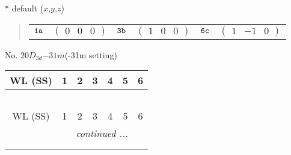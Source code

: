 \documentclass[fleqn,9pt,landscape]{jsarticle}
\begin{document}
* default ($x$,$y$,$z$)
\begin{quote}
\begin{tabular}{cccccc}
$ {\tt 1a} $ & $ \begin{pmatrix} 0 & 0 & 0 \end{pmatrix} $ & $ {\tt 3b} $ & $ \begin{pmatrix} 1 & 0 & 0 \end{pmatrix} $ & $ {\tt 6c} $ & $ \begin{pmatrix} 1 & -1 & 0 \end{pmatrix} $
\end{tabular}
\end{quote}
\newpage
No. 20\quad$D_{3d}$\quad$-31m$\quad(-31m setting)\quad[ trigonal ]
\begin{center}
\renewcommand{\arraystretch}{1.2}
\begin{longtable}{ccccccc}
 \hline \hline
WL (SS) & 1 & 2 & 3 & 4 & 5 & 6 \\ \hline \endfirsthead

\multicolumn{6}{l}{\tablename\ \thetable{}} \\
 \hline \hline
WL (SS) & 1 & 2 & 3 & 4 & 5 & 6 \\ \hline \endhead

 \hline \hline
\multicolumn{6}{r}{\footnotesize\it continued ...} \\ \endfoot

 \hline \hline
\multicolumn{6}{r}{} \\ \endlastfoot


\end{longtable}
\end{center}
\end{document}
